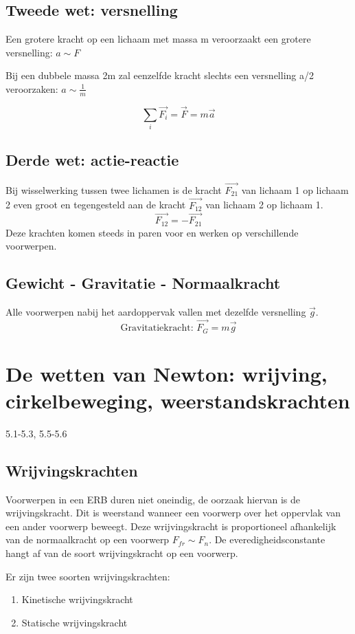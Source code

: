 \documentclass[12pt,a4paper]{article}
\begin{document}
    \subsection{Tweede wet: versnelling}
    Een grotere kracht op een lichaam met massa m veroorzaakt een grotere versnelling: $a \sim F$

    Bij een dubbele massa 2m zal eenzelfde kracht slechts een versnelling a/2 veroorzaken: $a \sim \frac{1}{m}$

    \[\sum_{i} \vec{F_i} = \vec{F} = m\vec{a}\]

    \subsection{Derde wet: actie-reactie}
    Bij wisselwerking tussen twee lichamen is de kracht \(\vec{F_{21}}\) van lichaam 1 op lichaam 2 even groot en tegengesteld aan de kracht \(\vec{F_{12}}\) van lichaam 2 op lichaam 1.
    \[\vec{F_{12}} = -\vec{F_{21}}\]
    Deze krachten komen steeds in paren voor en werken op verschillende voorwerpen.

    \subsection{Gewicht - Gravitatie - Normaalkracht}
    Alle voorwerpen nabij het aardoppervak vallen met dezelfde versnelling $\vec{g}$.
    \[\text{Gravitatiekracht: } \vec{F_G} = m\vec{g}\]


    \section{De wetten van Newton: wrijving, cirkelbeweging, weerstandskrachten}
    5.1-5.3, 5.5-5.6
    
    \subsection{Wrijvingskrachten}
    Voorwerpen in een ERB duren niet oneindig, de oorzaak hiervan is de wrijvingskracht. Dit is weerstand wanneer een voorwerp
    over het oppervlak van een ander voorwerp beweegt. Deze wrijvingskracht is proportioneel afhankelijk van de normaalkracht
    op een voorwerp $F_{fr} \sim F_{n}$.  De everedigheidsconstante hangt af van de soort wrijvingskracht op een voorwerp.\\
    
    \newpage
    
    Er zijn twee soorten wrijvingskrachten:
    \begin{enumerate}
            [label=\alph*)]
            \item Kinetische wrijvingskracht
            \item Statische wrijvingskracht
        \end{enumerate}
        
\end{document}

